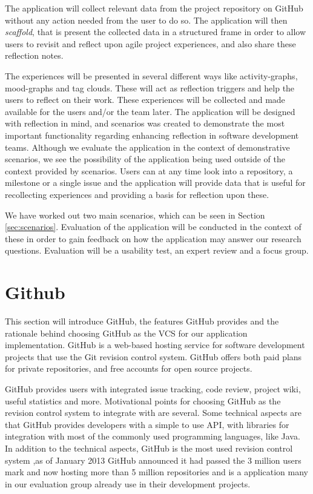 The application will collect relevant data from the project repository on GitHub without any action needed from the user to do so. The application will then \emph{scaffold}, that is present the collected data in a structured frame in order to allow users to revisit and reflect upon agile project experiences, and also share these reflection notes.

The experiences will be presented in several different ways like activity-graphs, mood-graphs and tag clouds. These will act as reflection triggers and help the users to reflect on their work. These experiences will be collected and made available for the users and/or the team later. The application will be designed with reflection in mind, and scenarios was created to demonstrate the most important functionality regarding enhancing reflection in software development teams. Although we evaluate the application in the context of demonstrative scenarios, we see the possibility of the application being used outside of the context provided by scenarios. Users can at any time look into a repository, a milestone or a single issue and the application will provide data that is useful for recollecting experiences and providing a basis for reflection upon these. 

We have worked out two main scenarios, which can be seen in Section \ref{sec:scenarios}. Evaluation of the application will be conducted in the context of these in order to gain feedback on how the application may answer our research questions. Evaluation will be a usability test, an expert review and a focus group. 

\section{Github}
\label{githubchapter}
This section will introduce GitHub, the features GitHub provides and the rationale behind choosing GitHub as the VCS for our application implementation. 
GitHub is a web-based hosting service for software development projects that use the Git revision control system\citep{git,github}. GitHub offers both paid plans for private repositories, and free accounts for open source projects.

GitHub provides users with integrated issue tracking, code review, project wiki, useful statistics and more. 
Motivational points for choosing GitHub as the revision control system to integrate with are several. Some technical aspects are that GitHub provides developers with a simple to use API\citep{githubapi}, with libraries for integration with most of the commonly used programming languages, like Java\citep{jgit}.
In addition to the technical aspects, GitHub is the most used revision control system ,as of January 2013 GitHub announced it had passed the 3 million users mark and now hosting more than 5 million repositories and is a application many in our evaluation group already use in their development projects\citep{githubnumbers}.

